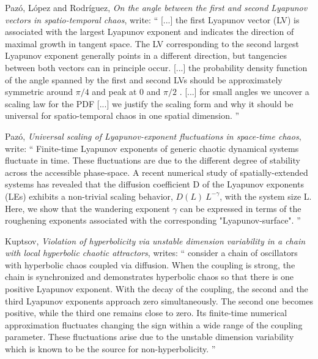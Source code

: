 \begin{description}
Paz\'o, L\'opez and Rodr\'iguez,
{\em On the angle between the first and second
          {Lyapunov} vectors in spatio-temporal chaos},
          write: ``
[...] the first Lyapunov vector (LV) is
  associated with the largest Lyapunov exponent and indicates
  the direction of maximal growth in tangent
  space. The LV corresponding to the second largest Lyapunov exponent
  generally points in a different direction, but tangencies between both
  vectors can in principle occur. [...] the probability
  density function of the angle spanned by the first and second
  LVs should be approximately symmetric around $\pi/4$ and
  peak at 0 and $\pi/2$ . [...] for small angles we uncover a scaling law
  for the PDF [...] we justify the
  scaling form and why it should be universal for spatio-temporal chaos in one spatial
  dimension.
''

Paz\'o\etal{},
{\em Universal scaling of {Lyapunov}-exponent fluctuations in space-time chaos},
write: ``
Finite-time Lyapunov exponents of generic chaotic dynamical systems fluctuate in time. These fluctuations are due to the different degree of stability across the accessible phase-space. A recent numerical study of spatially-extended systems has revealed that the diffusion coefficient D of the Lyapunov exponents (LEs) exhibits a non-trivial scaling behavior, $D(L) ~ L^{-\gamma}$, with the system size L. Here, we show that the wandering exponent $\gamma$ can be expressed in terms of the roughening exponents associated with the corresponding "Lyapunov-surface".
''


Kuptsov, {\em Violation of hyperbolicity via unstable
dimension variability in a chain with local hyperbolic chaotic
attractors}, writes: `` consider a chain of oscillators with hyperbolic
chaos coupled via diffusion. When the coupling is strong, the chain is
synchronized and demonstrates hyperbolic chaos so that there is one
positive Lyapunov exponent. With the decay of the coupling, the second
and the third Lyapunov exponents approach zero simultaneously. The second
one becomes positive, while the third one remains close to zero. Its
finite-time numerical approximation fluctuates changing the sign within a
wide range of the coupling parameter. These fluctuations arise due to the
unstable dimension variability which is known to be the source for
non-hyperbolicity. ''
	

\end{description}
